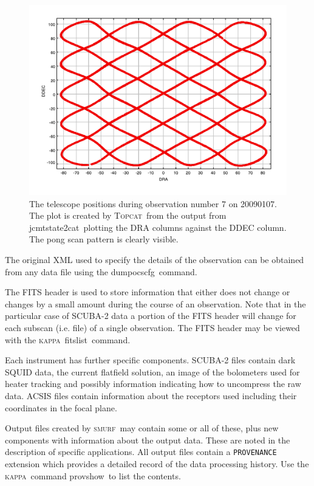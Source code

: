 \documentclass[twoside,11pt]{article}
\newcommand{\xref}[3]{#1}
\renewcommand{\_}{\texttt{\symbol{95}}}
\newcommand{\KAPPA}{\textsc{kappa}}
\newcommand{\SMURF}{\textsc{smurf}}
\newcommand{\task}[1]{\textsf{#1}}
\newcommand{\jcmtstate}{\xref{\task{jcmtstate2cat}}{sun258}{JCMTSTATE2CAT}}
\newcommand{\dumpocscfg}{\xref{\task{dumpocscfg}}{sun258}{DUMPOCSCFG}}
\newcommand{\provshow}{\xref{\task{provshow}}{sun95}{PROVSHOW}}
\newcommand{\fitslist}{\xref{\task{fitslist}}{sun95}{FITSLIST}}
\newcommand{\topcat}{\xref{\textsc{Topcat}}{sun253}{}}
\newcommand{\ndfcomp}[1]{\texttt{#1}}    %
\begin{document}
\begin{figure}
\begin{center}
\includegraphics{sun258_scan_pattern}
\caption{The telescope positions during observation number 7 on
  20090107. The plot is created by \topcat\ from the output from
\jcmtstate\ plotting the DRA columns against the DDEC column. The pong
scan pattern is clearly visible.}
\label{fig:topcat}
\end{center}
\end{figure}

The original XML used to specify the details of the observation can be
obtained from any data file using the \dumpocscfg\ command.

The FITS header is used to store information that either does not
change or changes by a small amount during the course of an
observation. Note that in the particular case of SCUBA-2 data a
portion of the FITS header will change for each subscan (i.e. file) of
a single observation. The FITS header may be viewed with the \KAPPA\
\fitslist\ command.

Each instrument has further specific components. SCUBA-2 files contain
dark SQUID data, the current flatfield solution, an image of the
bolometers used for heater tracking and possibly information
indicating how to uncompress the raw data. ACSIS files contain
information about the receptors used including their coordinates in
the focal plane.

Output files created by \SMURF\ may contain some or all of these, plus
new components with information about the output data. These are noted
in the description of specific applications. All output files contain
a \ndfcomp{PROVENANCE} extension which provides a detailed record of
the data processing history. Use the \KAPPA\ command \provshow\ to list
the contents.
\end{document}

